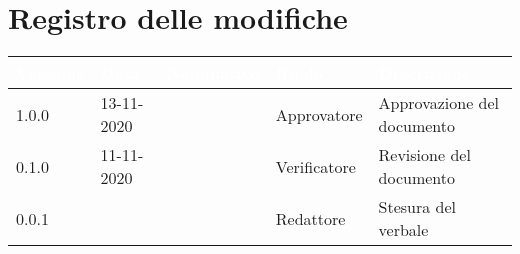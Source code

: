 \section*{Registro delle modifiche}
{
\setcounter{table}{-1}
{
\renewcommand{\arraystretch}{1.5}
\centering
\begin{longtable}{C{1.7cm} C{2.5cm} C{3.2cm} C{2.7cm} C{4.8cm}}
\textcolor{white}{\textbf{Versione}}&
\textcolor{white}{\textbf{Data}}&
\textcolor{white}{\textbf{Nominativo}}&
\textcolor{white}{\textbf{Ruolo}}&
\textcolor{white}{\textbf{Descrizione}}\\	
\endhead
		
1.0.0 & 13-11-2020 & \Approvatore{} & Approvatore & Approvazione del documento\\

0.1.0 & 11-11-2020 & \Verificatori{} & Verificatore & Revisione del documento\\

0.0.1 & \Data{} & \Redattori{} & Redattore & Stesura del verbale\\
		
\end{longtable}
}
}